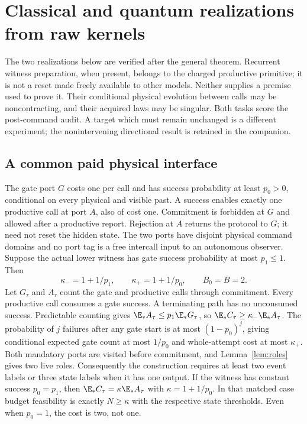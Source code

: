 \section{Classical and quantum realizations from raw kernels}\label{sec:realizations}
The two realizations below are verified after the general theorem. Recurrent witness preparation, when present, belongs to the charged productive primitive; it is not a reset made freely available to other models. Neither supplies a premise used to prove it. Their conditional physical evolution between calls may be noncontracting, and their acquired laws may be singular. Both tasks score the post-command audit. A target which must remain unchanged is a different experiment; the nonintervening directional result is retained in the companion.

\subsection*{A common paid physical interface}
The gate port $G$ costs one per call and has success probability at least $p_0>0$, conditional on every physical and visible past. A success enables exactly one productive call at port $A$, also of cost one. Commitment is forbidden at $G$ and allowed after a productive report. Rejection at $A$ returns the protocol to $G$; it need not reset the hidden state. The two ports have disjoint physical command domains and no port tag is a free intercall input to an autonomous observer. Suppose the actual lower witness has gate success probability at most $p_1\le1$. Then
\begin{equation}\label{eq:gate-constants}
 \kappa_-=1+1/p_1,\qquad \kappa_+=1+1/p_0,
 \qquad B_0=B=2.
\end{equation}
Let $G_\tau$ and $A_\tau$ count the gate and productive calls through commitment. Every productive call consumes a gate success. A terminating path has no unconsumed success. Predictable counting gives $\E_*A_\tau\le p_1\E_*G_\tau$, so $\E_*C_\tau\ge\kappa_-\E_*A_\tau$. The probability of $j$ failures after any gate start is at most $(1-p_0)^j$, giving conditional expected gate count at most $1/p_0$ and whole-attempt cost at most $\kappa_+$. Both mandatory ports are visited before commitment, and Lemma~\ref{lem:roles} gives two live roles. Consequently the construction requires at least two event labels or three state labels when it has one output. If the witness has constant success $p_0=p_1$, then $\E_*C_\tau=\kappa\E_*A_\tau$ with $\kappa=1+1/p_0$. In that matched case budget feasibility is exactly $N\ge\kappa$ with the respective state thresholds. Even when $p_0=1$, the cost is two, not one.

